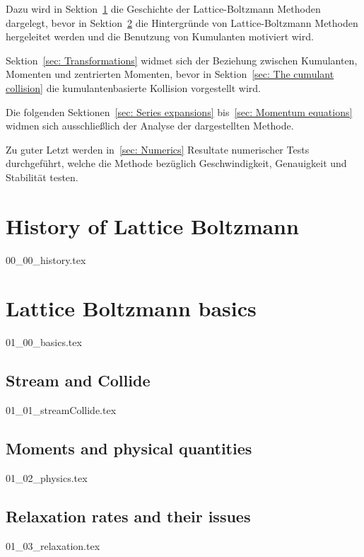 \documentclass[12pt,a4paper,twoside]{article}
\begin{document}
Dazu wird in Sektion~\ref{sec: History of Lattice Boltzmann} die Geschichte der Lattice-Boltzmann Methoden dargelegt, bevor in Sektion~\ref{sec: Lattice Boltzmann basics} die Hintergr\"unde von Lattice-Boltzmann Methoden hergeleitet werden und die Benutzung von Kumulanten motiviert wird.

Sektion~\ref{sec: Transformations} widmet sich der Beziehung zwischen Kumulanten, Momenten und zentrierten Momenten, bevor in Sektion~\ref{sec: The cumulant collision} die kumulantenbasierte Kollision vorgestellt wird.

Die folgenden Sektionen~\ref{sec: Series expansions} bis~\ref{sec: Momentum equations} widmen sich ausschließlich der Analyse der dargestellten Methode.

Zu guter Letzt werden in~\ref{sec: Numerics} Resultate numerischer Tests durchgeführt, welche die Methode bez\"uglich Geschwindigkeit, Genauigkeit und Stabilit\"at testen.

\newpage
\tableofcontents
\newpage
\printglossaries{}
\newpage

\pagestyle{headings}
\section{History of Lattice Boltzmann}
\label{sec: History of Lattice Boltzmann}
{00_00_history.tex}

\section{Lattice Boltzmann basics}
\label{sec: Lattice Boltzmann basics}
{01_00_basics.tex}

\subsection{Stream and Collide}
\label{sub: Stream and Collide}
{01_01_streamCollide.tex}

\subsection{Moments and physical quantities}
\label{sub: Moments and physical quantities}
{01_02_physics.tex}

\subsection{Relaxation rates and their issues}
\label{sub: Relaxation rates and their issues}
{01_03_relaxation.tex}
\end{document}
